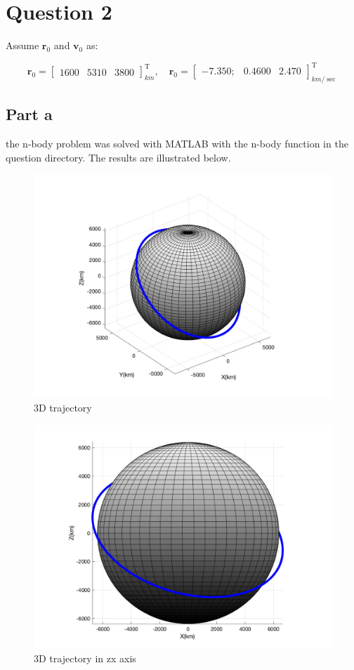 \section{Question 2}
Assume $\boldsymbol{r}_0$ and $\boldsymbol{v}_0$ as:


$$
\boldsymbol{r}_0 = \begin{bmatrix}
    1600 & 5310 & 3800
\end{bmatrix}^{\textrm{T}}_{km}, \quad
\boldsymbol{r}_0 = \begin{bmatrix}
    -7.350; & 0.4600 & 2.470
\end{bmatrix}^{\textrm{T}}_{km/\sec}
$$

\subsection{Part a}
the n-body problem was solved with MATLAB with the n-body function in the question directory.
The results are illustrated below.
\begin{figure}[H]
    \caption{3D trajectory}
    \centering
    \includegraphics[width=16cm]{../Figure/Q2/3Dof_view}
\end{figure}

\begin{figure}[H]
    \caption{3D trajectory in zx axis}
    \centering
    \includegraphics[width=16cm]{../Figure/Q2/xz_view}
\end{figure}

